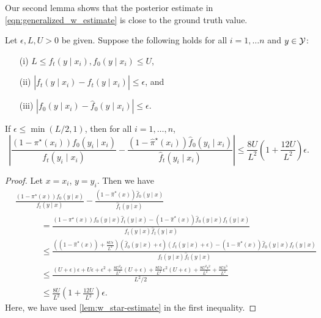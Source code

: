Our second lemma shows that the posterior estimate in \cref{eqn:generalized_w_estimate} is close to the ground truth value.

\begin{lemma}
\label{lem:posterior-approximation}
Let $\epsilon, L, U > 0$ be given. Suppose the following holds for all $i=1, \ldots n$ and $y \in \mathcal{Y}$:
\begin{itemize}
    \item[(i)] $L \leq f_t(y \mid x_i), f_0(y \mid x_i) \leq U$,
    \item [(ii)] $|f_t(y \mid x_i) - \hat{f}_t(y \mid x_i)| \leq \epsilon$, and
    \item[(iii)] $|f_0(y \mid x_i) - \hat{f}_0(y \mid x_i)| \leq \epsilon$.
\end{itemize}
If $\epsilon \leq \min (L/2, 1)$, then for all $i=1,\ldots, n$,
\[ \left|\frac{(1 - \pi^\star(x_i)) f_0(y_i \mid x_i)}{f_t(y_i \mid x_i)} - \frac{(1 - \hat{\pi}^\star(x_i)) \hat{f}_0(y_i \mid x_i)}{\hat{f}_t(y_i \mid x_i)} \right| \leq \frac{8U}{L^2} \left( 1 + \frac{12U}{L^2}\right) \epsilon.  \]
\end{lemma}
\begin{proof}
Let $x=x_i$, $y = y_i$. Then we have
\begin{align*}
&\frac{(1 - \pi^\star(x)) f_0(y \mid x)}{f_t(y \mid x)} - \frac{(1 - \hat{\pi}^\star(x)) \hat{f}_0(y \mid x)}{\hat{f}_t(y \mid x)}\\
&\hspace{3em}= \frac{(1 - \pi^\star(x)) f_0(y \mid x) \hat{f}_t(y \mid x) - (1 - \hat{\pi}^\star(x)) \hat{f}_0(y \mid x)f_t(y \mid x)}{f_t(y \mid x)\hat{f}_t(y \mid x)} \\
&\hspace{3em}\leq \frac{ ((1 - \hat{\pi}^\star(x)) + \frac{8U\epsilon}{L^2}) (\hat{f}_0(y \mid x) + \epsilon)(f_t(y \mid x) + \epsilon)- (1 - \hat{\pi}^\star(x)) \hat{f}_0(y \mid x)f_t(y \mid x)}{f_t(y \mid x)\hat{f}_t(y \mid x)} \\
&\hspace{3em}\leq \frac{(U + \epsilon)\epsilon + U\epsilon + \epsilon^2 + \frac{8U^2 \epsilon}{L^2}(U+\epsilon) + \frac{8U \epsilon}{L^2}\epsilon^2 (U + \epsilon) + \frac{8U^2 \epsilon^2}{L^2} + \frac{8U \epsilon^3}{L^2} }{L^2/2} \\
&\hspace{3em}\leq \frac{8U}{L^2} \left( 1 + \frac{12U}{L^2}\right) \epsilon. 
\end{align*}
Here, we have used \cref{lem:w_star-estimate} in the first inequality.
\end{proof}

